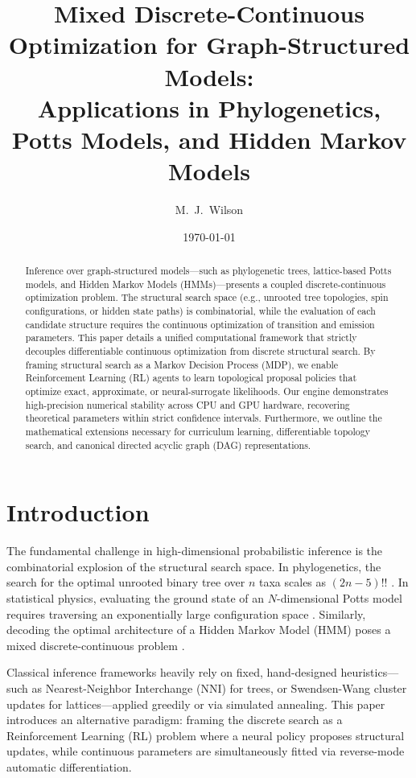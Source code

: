 \documentclass[11pt,a4paper]{article}
\title{Mixed Discrete-Continuous Optimization for Graph-Structured Models: \\ 
Applications in Phylogenetics, Potts Models, and Hidden Markov Models}
\author{M.\ J.\ Wilson}
\date{\today}
\begin{document}
\maketitle

\begin{abstract}
\noindent
Inference over graph-structured models---such as phylogenetic trees, lattice-based Potts models, and Hidden Markov Models (HMMs)---presents a coupled discrete-continuous optimization problem. The structural search space (e.g., unrooted tree topologies, spin configurations, or hidden state paths) is combinatorial, while the evaluation of each candidate structure requires the continuous optimization of transition and emission parameters. This paper details a unified computational framework that strictly decouples differentiable continuous optimization from discrete structural search. By framing structural search as a Markov Decision Process (MDP), we enable Reinforcement Learning (RL) agents to learn topological proposal policies that optimize exact, approximate, or neural-surrogate likelihoods. Our engine demonstrates high-precision numerical stability across CPU and GPU hardware, recovering theoretical parameters within strict confidence intervals. Furthermore, we outline the mathematical extensions necessary for curriculum learning, differentiable topology search, and canonical directed acyclic graph (DAG) representations. 
\end{abstract}

\tableofcontents

\section{Introduction}
\label{sec:intro}

The fundamental challenge in high-dimensional probabilistic inference is the combinatorial explosion of the structural search space. In phylogenetics, the search for the optimal unrooted binary tree over $n$ taxa scales as $(2n-5)!!$ \citep{rosen2019}. In statistical physics, evaluating the ground state of an $N$-dimensional Potts model requires traversing an exponentially large configuration space \citep{mezard2009}. Similarly, decoding the optimal architecture of a Hidden Markov Model (HMM) poses a mixed discrete-continuous problem \citep{mackay2003}.

Classical inference frameworks heavily rely on fixed, hand-designed heuristics---such as Nearest-Neighbor Interchange (NNI) for trees, or Swendsen-Wang cluster updates for lattices---applied greedily or via simulated annealing. This paper introduces an alternative paradigm: framing the discrete search as a Reinforcement Learning (RL) problem where a neural policy proposes structural updates, while continuous parameters are simultaneously fitted via reverse-mode automatic differentiation. 
\end{document}
